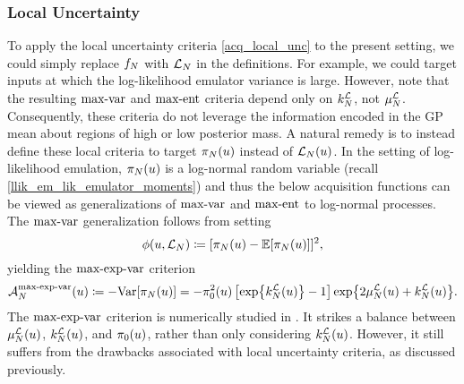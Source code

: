 \documentclass[12pt]{article}
\begin{document}
\subsubsection{Local Uncertainty}
To apply the local uncertainty criteria \ref{acq_local_unc} to the present setting, we could simply replace 
$\funcEm$ with $\llikEm$ in the definitions. For example, we could target inputs at which the log-likelihood 
emulator variance is large. However, note that the resulting $\maxvarLabel$ and 
$\maxentLabel$ criteria depend only on $\emKer[\Ndesign]{\llik}$, not $\emMean[\Ndesign]{\llik}$.
Consequently, these criteria do not leverage the information encoded in the GP mean about 
regions of high or low posterior mass. A natural remedy is to instead define these local criteria to 
target $\llikEmRdmDens[\Ndesign](\Par)$ instead of $\llikEm(\Par)$. In the setting of log-likelihood 
emulation, $\llikEmRdmDens[\Ndesign](\Par)$ is a log-normal random variable 
(recall \ref{llik_em_lik_emulator_moments}) and thus the below acquisition functions can be viewed 
as generalizations of $\maxvarLabel$ and $\maxentLabel$ to log-normal processes. The 
$\maxvarLabel$ generalization follows from setting 
\begin{equation}
\qoiMap(\Par, \llikEm) \Def [\llikEmRdmDens[\Ndesign](\Par) - \E[\llikEmRdmDens[\Ndesign](\Par)]]^2, \label{qoi_exp_var}
\end{equation}
yielding the $\maxexpvarLabel$ criterion
\begin{equation}
\labelAcq[\Ndesign]{\maxexpvarLabel}(\Par) \Def -\Var[\llikEmRdmDens[\Ndesign](\Par)]  
=  -\priorDens^2(\Par) \left[\Exp{\emKer[\Ndesign]{\llik}(\Par)} - 1 \right] \Exp{2\emMean[\Ndesign]{\llik}(\Par) + \emKer[\Ndesign]{\llik}(\Par)}.
\label{acq_max_exp_var}
\end{equation}
The $\maxexpvarLabel$ criterion is numerically studied in \cite{KandasamyActiveLearning2015, Kandasamy_2017}.
It strikes a balance between $\emMean[\Ndesign]{\llik}(\Par)$, $\emKer[\Ndesign]{\llik}(\Par)$, and $\priorDens(\Par)$, 
rather than only considering $\emKer[\Ndesign]{\llik}(\Par)$. However, it still suffers from the drawbacks associated with
 local uncertainty criteria, as discussed previously. 
  
\end{document}
